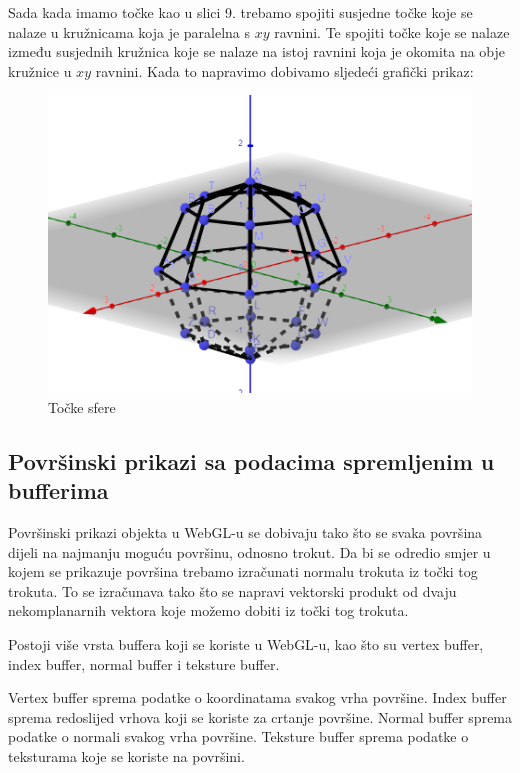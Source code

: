 \documentclass[a4paper,12pt]{article}
\begin{document}
Sada kada imamo točke kao u slici 9. trebamo spojiti susjedne točke koje se nalaze u kružnicama koja je paralelna s $xy$ ravnini.
Te spojiti točke koje se nalaze između susjednih kružnica koje se nalaze na istoj ravnini koja je okomita na obje kružnice u $xy$ ravnini.
Kada to napravimo dobivamo sljedeći grafički prikaz:

\begin{figure}[ht]
    \centering
    \includegraphics[scale=1]{image/zadatak2_sfera_geo.png}
    \caption{Točke sfere}
    
\end{figure}
\pagebreak

\subsection*{Površinski prikazi sa podacima spremljenim u bufferima}
Površinski prikazi objekta u WebGL-u se dobivaju tako što se svaka površina dijeli na najmanju moguću površinu, odnosno trokut. Da bi se odredio smjer u kojem se prikazuje površina trebamo izračunati
normalu trokuta iz točki tog trokuta. To se izračunava tako što se napravi vektorski produkt od dvaju nekomplanarnih vektora koje možemo dobiti iz točki tog trokuta.

Postoji više vrsta buffera koji se koriste u WebGL-u, kao što su vertex buffer, index buffer, normal buffer i teksture buffer.

Vertex buffer sprema podatke o koordinatama svakog vrha površine. Index buffer sprema redoslijed vrhova koji se koriste za crtanje površine. Normal buffer sprema podatke o normali svakog vrha površine. Teksture buffer sprema podatke o teksturama koje se koriste na površini.
\end{document}
